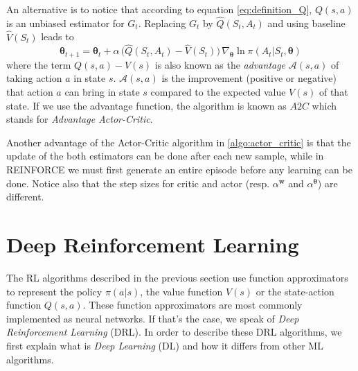 An alternative is to notice that according to equation \ref{eq:definition_Q}, $Q(s,a)$ is an unbiased estimator for $G_t$. Replacing $G_t$ by $\hat Q(S_t, A_t)$ and using baseline $\hat V(S_t)$ leads to
\begin{equation}
\bm{\theta}_{t+1} = \bm{\theta}_{t} + \alpha \,\big (\hat Q(S_t, A_t) - \hat V(S_t) \big) \, \nabla_{\bm{\theta}} \ln \pi(A_t|S_t,\bm{\theta})
\end{equation}
where the term $Q(s,a) - V(s)$ is also known as the \emph{advantage} $\mathcal{A}(s, a)$ of taking action $a$ in state $s$. $\mathcal{A}(s, a)$ is the improvement (positive or negative) that action $a$ can bring in state $s$ compared to the expected value $V(s)$ of that state. If we use the advantage function, the algorithm is known as $A2C$ which stands for \emph{Advantage Actor-Critic}.\\

Another advantage of the Actor-Critic algorithm in \ref{algo:actor_critic} is that the update of the both estimators can be done after each new sample, while in REINFORCE we must first generate an entire episode before any learning can be done. Notice also that the step sizes for critic and actor (resp. $\alpha^{\bm{w}}$ and $\alpha^{\bm{\theta}}$) are different.\\

\section{Deep Reinforcement Learning}
\label{sec:intro_deep_rl}
The RL algorithms described in the previous section use function approximators to represent the policy $\pi(a|s)$, the value function $V(s)$ or the state-action function $Q(s,a)$. These function approximators are most commonly implemented as neural networks. If that's the case, we speak of \emph{Deep Reinforcement Learning} (DRL). In order to describe these DRL algorithms, we first explain what is \emph{Deep Learning} (DL) and how it differs from other ML algorithms.

